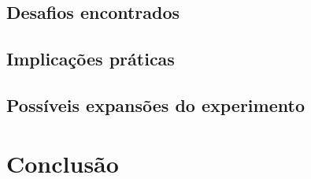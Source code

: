 \documentclass[
    12pt,
    openany,
    oneside,
    a4paper,
    english,
    brazil
]{abntex2}
\begin{document}
\section{Desafios encontrados}

\section{Implicações práticas}

\section{Possíveis expansões do experimento}

\chapter{Conclusão}

\postextual

\end{document}
